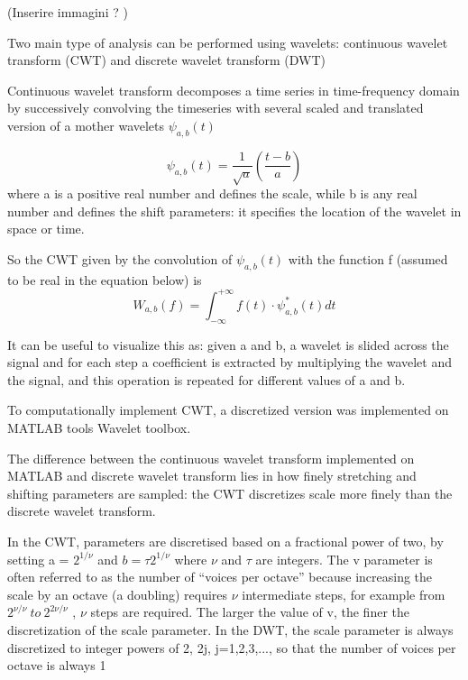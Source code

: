 \documentclass[a4paper,11pt]{article}
\begin{document}
(Inserire immagini ? )

Two main type of analysis can be performed using wavelets: continuous wavelet transform (CWT) and discrete wavelet transform (DWT)

Continuous wavelet transform decomposes a time series in time-frequency domain by successively convolving the timeseries with several scaled and translated version of a mother wavelets $\psi_{a, b}\left(t\right)$

\begin{equation}
\psi_{a, b}\left(t\right) = \frac{1}{\sqrt{a}}\left(\frac{t-b}{a}\right)
\end{equation}
where a is a positive real number and defines the scale, while b is any real number and defines the shift parameters: it specifies the location of the wavelet in space or time.

So the CWT given by the convolution of $\psi_{a, b}\left(t\right)$  with the function f (assumed to be real in the equation below) is
\begin{equation}
W_{a,b}(f) = \int_{-\infty}^{+\infty}  f(t) \cdot \psi_{a, b}^\ast \left(t\right)   dt
\end{equation}

It can be useful to visualize this as: given a and b, a wavelet is slided across the signal and for each step a coefficient is extracted by multiplying the wavelet and the signal, and this operation is repeated for different values of a and b.

To computationally implement CWT, a discretized version was implemented on MATLAB tools Wavelet toolbox.

The difference between the continuous wavelet transform implemented on MATLAB and discrete wavelet transform lies in how finely stretching and shifting parameters are sampled: the CWT discretizes scale more finely than the discrete wavelet transform.

In the CWT, parameters are discretised based on a fractional power of two, by setting a = $2^{1/\nu}$ and $b = \tau 2^{1/\nu}$ where $\nu$ and $\tau$ are integers. The v parameter is often referred to as the number of “voices per octave” because increasing the scale by an octave (a doubling) requires $\nu$ intermediate steps, for example from $2^{\nu/\nu} \ to \ 2^{2\nu/\nu}$ , $\nu$ steps are required.
The larger the value of v, the finer the discretization of the scale parameter.
In the DWT, the scale parameter is always discretized to integer powers of 2, 2j, j=1,2,3,..., so that the number of voices per octave is always 1
\end{document}
